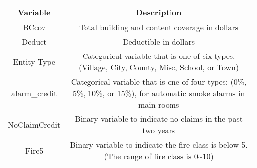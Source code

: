 \documentclass[]{book}
\theoremstyle{definition}
\theoremstyle{definition}
\theoremstyle{definition}
\theoremstyle{remark}
\begin{document}
\begin{longtable}[]{@{}cc@{}}
\toprule
\begin{minipage}[b]{0.21\columnwidth}\centering\strut
Variable\strut
\end{minipage} & \begin{minipage}[b]{0.42\columnwidth}\centering\strut
Description\strut
\end{minipage}\tabularnewline
\midrule
\endhead
\begin{minipage}[t]{0.21\columnwidth}\centering\strut
BCcov\strut
\end{minipage} & \begin{minipage}[t]{0.42\columnwidth}\centering\strut
Total building and content coverage in dollars\strut
\end{minipage}\tabularnewline
\begin{minipage}[t]{0.21\columnwidth}\centering\strut
Deduct\strut
\end{minipage} & \begin{minipage}[t]{0.42\columnwidth}\centering\strut
Deductible in dollars\strut
\end{minipage}\tabularnewline
\begin{minipage}[t]{0.21\columnwidth}\centering\strut
Entity Type\strut
\end{minipage} & \begin{minipage}[t]{0.42\columnwidth}\centering\strut
Categorical variable that is one of six types: (Village, City, County,
Misc, School, or Town)\strut
\end{minipage}\tabularnewline
\begin{minipage}[t]{0.21\columnwidth}\centering\strut
alarm\_credit\strut
\end{minipage} & \begin{minipage}[t]{0.42\columnwidth}\centering\strut
Categorical variable that is one of four types: (0\%, 5\%, 10\%, or
15\%), for automatic smoke alarms in main rooms\strut
\end{minipage}\tabularnewline
\begin{minipage}[t]{0.21\columnwidth}\centering\strut
NoClaimCredit\strut
\end{minipage} & \begin{minipage}[t]{0.42\columnwidth}\centering\strut
Binary variable to indicate no claims in the past two years\strut
\end{minipage}\tabularnewline
\begin{minipage}[t]{0.21\columnwidth}\centering\strut
Fire5\strut
\end{minipage} & \begin{minipage}[t]{0.42\columnwidth}\centering\strut
Binary variable to indicate the fire class is below 5. (The range of
fire class is 0\textasciitilde{}10)\strut
\end{minipage}\tabularnewline
\bottomrule
\end{longtable}
\end{document}
